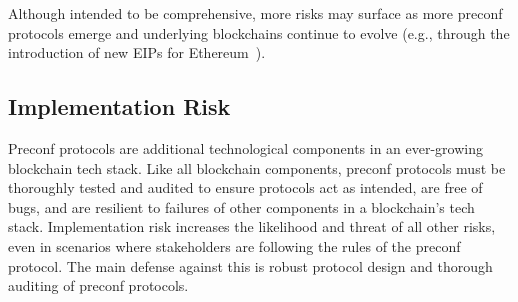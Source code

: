 \documentclass[a4paper]{article}
\theoremstyle{boldstyle}
\begin{document}
    Although intended to be comprehensive, more risks may surface as more preconf protocols emerge and underlying blockchains continue to evolve (e.g., through the introduction of new EIPs for Ethereum~\cite{W:Future-ProofingPreconfirmations}). 
    
    \begin{table}[h!] 
        \centering
        \caption{Preconf Risks}
        \label{tab:preconf_risks} 
    \end{table}

\subsection{Implementation Risk}
    Preconf protocols are additional technological components in an ever-growing blockchain tech stack. Like all blockchain components, preconf protocols must be thoroughly tested and audited to ensure protocols act as intended, are free of bugs, and are resilient to failures of other components in a blockchain's tech stack. Implementation risk increases the likelihood and threat of all other risks, even in scenarios where stakeholders are following the rules of the preconf protocol. The main defense against this is robust protocol design and thorough auditing of preconf protocols.
\end{document}
